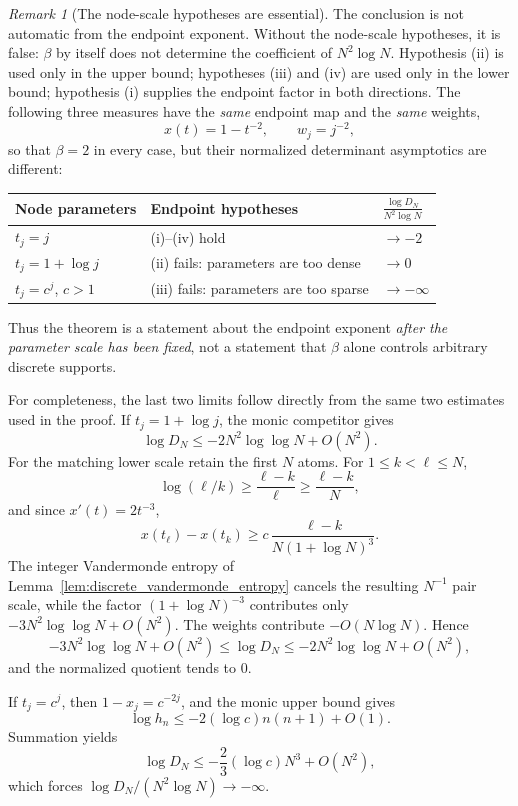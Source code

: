 \documentclass[preprint,12pt]{elsarticle}
\numberwithin{equation}{section}
\theoremstyle{plain}
\theoremstyle{definition}
\theoremstyle{remark}
\newtheorem{remark}[theorem]{Remark}
\begin{document}
\begin{remark}[The node-scale hypotheses are essential]
\label{rem:endpoint_hypotheses_essential}
The conclusion is not automatic from the endpoint exponent.  Without the node-scale
hypotheses, it is false: \(\beta\) by itself does not determine the coefficient of
\(N^2\log N\).  Hypothesis (ii) is used only in the upper bound; hypotheses (iii) and (iv)
are used only in the lower bound; hypothesis (i) supplies the endpoint factor in both directions.
The following three measures have the \emph{same} endpoint map and the \emph{same} weights,
\[
x(t)=1-t^{-2},\qquad w_j=j^{-2},
\]
so that \(\beta=2\) in every case, but their normalized determinant asymptotics are different:
\begin{center}
\small
\begin{tabular}{p{}p{}p{}}
\toprule
\textbf{Node parameters} & \textbf{Endpoint hypotheses} &
\(\displaystyle \frac{\log D_N}{N^2\log N}\)\\
\midrule
\(t_j=j\) & (i)--(iv) hold & \(\longrightarrow -2\)\\
\(t_j=1+\log j\) & (ii) fails: parameters are too dense & \(\longrightarrow 0\)\\
\(t_j=c^j\), \(c>1\) & (iii) fails: parameters are too sparse & \(\longrightarrow -\infty\)\\
\bottomrule
\end{tabular}
\end{center}
Thus the theorem is a statement about the endpoint exponent \emph{after the parameter scale has
been fixed}, not a statement that \(\beta\) alone controls arbitrary discrete supports.

For completeness, the last two limits follow directly from the same two estimates used in the
proof.  If \(t_j=1+\log j\), the monic competitor gives
\[
\log D_N\le -2N^2\log\log N+O(N^2).
\]
For the matching lower scale retain the first \(N\) atoms.  For \(1\le k<\ell\le N\),
\[
\log(\ell/k)\ge\frac{\ell-k}{\ell}\ge\frac{\ell-k}{N},
\]
and since \(x'(t)=2t^{-3}\),
\[
x(t_\ell)-x(t_k)
\ge c\,\frac{\ell-k}{N(1+\log N)^3}.
\]
The integer Vandermonde entropy of Lemma~\ref{lem:discrete_vandermonde_entropy} cancels the
resulting \(N^{-1}\) pair scale, while the factor \((1+\log N)^{-3}\) contributes only
\(-3N^2\log\log N+O(N^2)\).  The weights contribute \(-O(N\log N)\).  Hence
\[
-3N^2\log\log N+O(N^2)
\le \log D_N
\le -2N^2\log\log N+O(N^2),
\]
and the normalized quotient tends to \(0\).

If \(t_j=c^j\), then \(1-x_j=c^{-2j}\), and the monic upper bound gives
\[
\log h_n\le -2(\log c)n(n+1)+O(1).
\]
Summation yields
\[
\log D_N\le -\frac{2}{3}(\log c)N^3+O(N^2),
\]
which forces \(\log D_N/(N^2\log N)\to-\infty\).


\end{remark}
\end{document}
